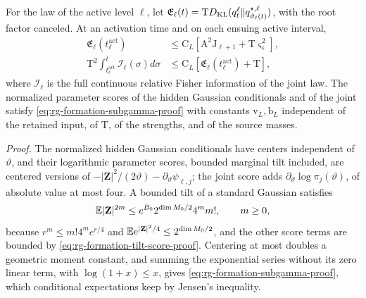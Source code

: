 For the law of the active level \(\ell\), let
\(\mathfrak E_\ell(t)=\mathrm TD_{\mathrm{KL}}(q_t^\ell\Vert q^{\star,\ell}_{\vartheta_\ell(t)})\),
with the root factor canceled. At an activation time and on each ensuing
active interval,
\begin{align}
 \mathfrak E_\ell(t^{\mathrm{act}}_\ell)&\le \mathrm C_L[\mathrm A^2\mathrm J_{\ell+1}+\mathrm T\varsigma_\epsilon^2],
 \label{eq:rg-formation-activation-budget}\\
 \mathrm T^2\int_{t^{\mathrm{act}}_\ell}^{t}\mathcal I_\ell(\sigma) d\sigma
 &\le \mathrm C_L[\mathfrak E_\ell(t^{\mathrm{act}}_\ell)+\mathrm T],
 \label{eq:rg-formation-full-fisher-budget}
\end{align}
where \(\mathcal I_\ell\) is the full continuous relative Fisher information of
the joint law. The normalized parameter scores of the hidden Gaussian
conditionals and of the joint satisfy \cref{eq:rg-formation-subgamma-proof}
with constants \(\mathrm v_L,\mathrm b_L\) independent of the retained input,
of \(\mathrm T\), of the strengths, and of the source masses.

\noindent\emph{Proof.}
The normalized hidden Gaussian conditionals have centers independent of
\(\vartheta\), and their logarithmic parameter scores, bounded marginal tilt
included, are centered versions of
\(-|\mathbf Z|^2/(2\vartheta)-\partial_\vartheta\psi_{\ell,j}\); the joint score
adds \(\partial_\vartheta\log\pi_j(\vartheta)\), of absolute value at most four.
A bounded tilt of a standard Gaussian satisfies
\begin{equation}
 \mathbb E|\mathbf Z|^{2m}
 \le e^{B_0}2^{\dim M_0/2}4^m m!,\qquad m\ge0,
 \label{eq:rg-formation-gaussian-score-moments}
\end{equation}
because \(r^m\le m!4^me^{r/4}\) and
\(\mathbb E e^{|\mathbf Z|^2/4}\le2^{\dim M_0/2}\), and the other score terms are
bounded by \cref{eq:rg-formation-tilt-score-proof}. Centering at most doubles
a geometric moment constant, and summing the exponential series without its
zero linear term, with \(\log(1+x)\le x\), gives
\cref{eq:rg-formation-subgamma-proof}, which conditional expectations keep by
Jensen's inequality.

